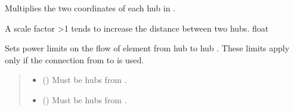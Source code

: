 \documentclass[letterpaper,10pt,english]{sphinxmanual}
\begin{document}
\begin{fulllineitems}
\begin{fulllineitems}
\end{fulllineitems}


\begin{fulllineitems}
\label{\detokenize{generated/tamos.network.HREThermalNetwork:tamos.network.HREThermalNetwork.scale_factor}}
\pysigstartsignatures
{}
\pysigstopsignatures
\sphinxAtStartPar
Multiplies the two coordinates of each hub in .

\sphinxAtStartPar
A scale factor \textgreater{}1 tends to increase the distance between two hubs.
float

\end{fulllineitems}


\begin{fulllineitems}
\label{\detokenize{generated/tamos.network.HREThermalNetwork:tamos.network.HREThermalNetwork.set_connection_power_bounds}}
\pysigstartsignatures
{}
\pysigstopsignatures
\sphinxAtStartPar
Sets power limits on the flow of element from hub  to hub .
These limits apply only if the connection from  to  is used.
\begin{quote}\begin{description}
\begin{itemize}
\item {} 
\sphinxAtStartPar
{} ({\hyperref[\detokenize{generated/tamos.Hub:tamos.Hub}]{}}) \textendash{} Must be hubs from .

\item {} 
\sphinxAtStartPar
{} ({\hyperref[\detokenize{generated/tamos.Hub:tamos.Hub}]{}}) \textendash{} Must be hubs from .


\end{itemize}
\end{description}
\end{quote}
\end{fulllineitems}
\end{fulllineitems}
\end{document}
